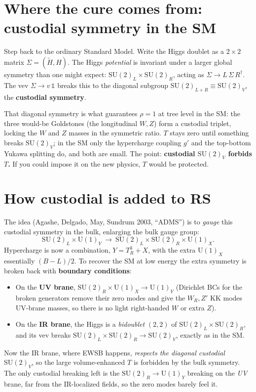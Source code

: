 \documentclass[11pt]{article}
\begin{document}
\section{Where the cure comes from: custodial symmetry in the SM}

Step back to the ordinary Standard Model. Write the Higgs doublet as a $2\times2$
matrix $\Sigma=(\tilde H, H)$. The Higgs \emph{potential} is invariant under a larger
global symmetry than one might expect: $\mathrm{SU(2)}_L\times\mathrm{SU(2)}_R$,
acting as $\Sigma\to L\,\Sigma\,R^\dagger$. The vev $\Sigma\to v\,\mathbb{1}$ breaks
this to the diagonal subgroup $\mathrm{SU(2)}_{L+R}\equiv\mathrm{SU(2)}_V$, the
\textbf{custodial symmetry}.

That diagonal symmetry is what guarantees $\rho=1$ at tree level in the SM: the three
would-be Goldstones (the longitudinal $W,Z$) form a custodial triplet, locking the
$W$ and $Z$ masses in the symmetric ratio. $T$ stays zero until something breaks
$\mathrm{SU(2)}_V$; in the SM only the hypercharge coupling $g'$ and the top-bottom
Yukawa splitting do, and both are small. The point: \textbf{custodial
$\mathrm{SU(2)}_V$ forbids $T$.} If you could impose it on the new physics, $T$ would
be protected.

\section{How custodial is added to RS}

The idea (Agashe, Delgado, May, Sundrum 2003, ``ADMS'') is to \emph{gauge} this
custodial symmetry in the bulk, enlarging the bulk gauge group:
\[
\mathrm{SU(2)}_L\times\mathrm{U(1)}_Y\ \longrightarrow\
\mathrm{SU(2)}_L\times\mathrm{SU(2)}_R\times\mathrm{U(1)}_X.
\]
Hypercharge is now a combination, $Y=T^3_R+X$, with the extra $\mathrm{U(1)}_X$
essentially $(B-L)/2$. To recover the SM at low energy the extra symmetry is broken
back with \textbf{boundary conditions}:
\begin{itemize}
\item On the \textbf{UV brane}, $\mathrm{SU(2)}_R\times\mathrm{U(1)}_X\to\mathrm{U(1)}_Y$
(Dirichlet BCs for the broken generators remove their zero modes and give the
$W_R,Z'$ KK modes UV-brane masses, so there is no light right-handed $W$ or extra
$Z$).
\item On the \textbf{IR brane}, the Higgs is a \emph{bidoublet} $(2,2)$ of
$\mathrm{SU(2)}_L\times\mathrm{SU(2)}_R$, and its vev breaks
$\mathrm{SU(2)}_L\times\mathrm{SU(2)}_R\to\mathrm{SU(2)}_V$, exactly as in the SM.
\end{itemize}
Now the IR brane, where EWSB happens, \emph{respects the diagonal custodial
$\mathrm{SU(2)}_V$}, so the large volume-enhanced $T$ is forbidden by the bulk
symmetry. The only custodial breaking left is the $\mathrm{SU(2)}_R\to\mathrm{U(1)}_Y$
breaking on the \emph{UV} brane, far from the IR-localized fields, so the zero modes
barely feel it.
\end{document}
